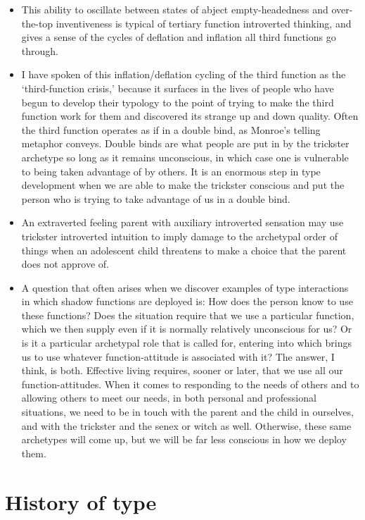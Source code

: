 \begin{itemize}
\item This ability to oscillate between states of abject empty-headedness and
over-the-top inventiveness is typical of tertiary function introverted
thinking, and gives a sense of the cycles of deflation and inflation all third
functions go through.

\item I have spoken of this inflation/deflation cycling of the third function
as the ‘third-function crisis,’ because it surfaces in the lives of people who
have begun to develop their typology to the point of trying to make the third
function work for them and discovered its strange up and down quality. Often
the third function operates as if in a double bind, as Monroe’s telling
metaphor conveys. Double binds are what people are put in by the trickster
archetype so long as it remains unconscious, in which case one is vulnerable to
being taken advantage of by others. It is an enormous step in type development
when we are able to make the trickster conscious and put the person who is
trying to take advantage of us in a double bind.

\item An extraverted feeling parent with auxiliary introverted sensation may
use trickster introverted intuition to imply damage to the archetypal order of
things when an adolescent child threatens to make a choice that the parent does
not approve of.

\item A question that often arises when we discover examples of type
interactions in which shadow functions are deployed is: How does the person
know to use these functions? Does the situation require that we use a
particular function, which we then supply even if it is normally relatively
unconscious for us? Or is it a particular archetypal role that is called for,
entering into which brings us to use whatever function-attitude is associated
with it? The answer, I think, is both. Effective living requires, sooner or
later, that we use all our function-attitudes. When it comes to responding to
the needs of others and to allowing others to meet our needs, in both personal
and professional situations, we need to be in touch with the parent and the
child in ourselves, and with the trickster and the senex or witch as well.
Otherwise, these same archetypes will come up, but we will be far less
conscious in how we deploy them.

\end{itemize}

\section{History of type}

